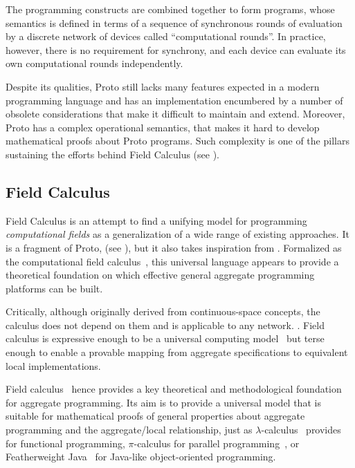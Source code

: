 \documentclass[12pt,a4paper,twoside,openright]{book}
\begin{document}
The programming constructs are combined together to form programs, whose semantics is defined in terms of a sequence of synchronous rounds of evaluation by a discrete network of devices called ``computational rounds''.
%
In practice, however, there is no requirement for synchrony, and each device can evaluate its own computational rounds independently.

Despite its qualities, Proto still lacks many features expected in a modern programming language and has an implementation encumbered by a number of obsolete considerations that make it difficult to maintain and extend.
%
Moreover, Proto has a complex operational semantics, that makes it hard to develop mathematical proofs about Proto programs.
%
Such complexity is one of the pillars sustaining the efforts behind Field Calculus (see ).

\subsection{Field Calculus}
\label{field-calculus}

Field Calculus is an attempt to find a unifying model for programming \emph{computational fields} as a generalization of a wide range of existing approaches.
%
It is a fragment of Proto, (see ), but it also takes inspiration from \cite{mamei2009acm,regiment,VCMZ-TAAS2011,tota2,nagpalphd,yamins,regiment}.
%
Formalized as the computational field calculus~\cite{VDB-FOCLASA-CIC2013}, this universal language appears to provide a theoretical foundation on which effective general aggregate programming platforms can be built.

Critically, although originally derived from continuous-space concepts, the calculus does not depend on them and is applicable to any network.
. %
Field calculus is expressive enough to be a universal computing model~\cite{BVD-SCW14} but terse enough to enable a provable mapping from aggregate specifications to equivalent local implementations.

Field calculus~\cite{VDB-FOCLASA-CIC2013} hence provides a key theoretical and methodological foundation for aggregate programming.
%
Its aim is to provide a universal model that is suitable for mathematical proofs of general properties about aggregate programming and the aggregate/local relationship, just as $\lambda$-calculus~\cite{LambdaCalculus} provides for functional programming, $\pi$-calculus for parallel programming~\cite{PiCalculus}, or Featherweight Java~\cite{FJ} for Java-like object-oriented programming.
\end{document}
